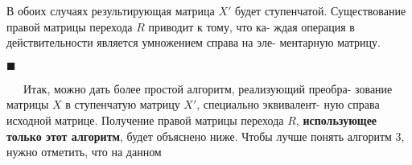 \documentclass{mai_book}
\begin{document}
	В обоих случаях результирующая матрица $X'$ будет ступенчатой.\linebreak
	Существование правой матрицы перехода $R$ приводит к тому, что ка-\linebreak
	ждая операция в действительности является умножением справа на эле-\linebreak
	ментарную матрицу.
	\begin{flushright}$\blacksquare$\end{flushright}
	{\ \ \ }Итак, можно дать более простой алгоритм, реализующий преобра-\linebreak
	зование матрицы $X$ в ступенчатую матрицу $X'$, специально эквивалент-\linebreak
	ную справа исходной матрице. Получение правой матрицы перехода $R$,\linebreak
	{\bf использующее только этот алгоритм}, будет объяснено ниже.\linebreak
	Чтобы лучше понять алгоритм 3, нужно отметить, что на данном\linebreak
	\noindent
%	
%	
%	
%	
%	
\end{document}
